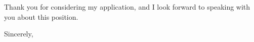 \documentclass[letterpaper, 10pt]{letter}
\begin{document}
\begin{letter}
Thank you for considering my application, and I look forward to speaking with
you about this position.

\addtolength{\medskipamount}{-5pt}
\closing{Sincerely,}
\end{letter}
\end{document}
